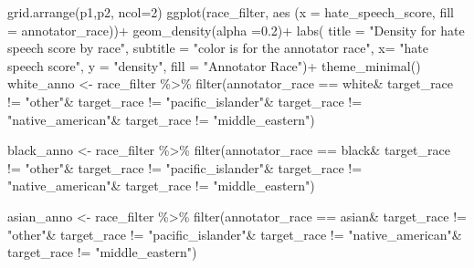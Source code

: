 \documentclass[
]{article}
\newenvironment{Shaded}{\begin{snugshade}}{\end{snugshade}}
\newcommand{\AttributeTok}[1]{\textcolor[rgb]{0.77,0.63,0.00}{#1}}
\newcommand{\DecValTok}[1]{\textcolor[rgb]{0.00,0.00,0.81}{#1}}
\newcommand{\FloatTok}[1]{\textcolor[rgb]{0.00,0.00,0.81}{#1}}
\newcommand{\FunctionTok}[1]{\textcolor[rgb]{0.00,0.00,0.00}{#1}}
\newcommand{\NormalTok}[1]{#1}
\newcommand{\OtherTok}[1]{\textcolor[rgb]{0.56,0.35,0.01}{#1}}
\newcommand{\SpecialCharTok}[1]{\textcolor[rgb]{0.00,0.00,0.00}{#1}}
\newcommand{\StringTok}[1]{\textcolor[rgb]{0.31,0.60,0.02}{#1}}
\begin{document}
\begin{Shaded}
\begin{Highlighting}[]
\FunctionTok{grid.arrange}\NormalTok{(p1,p2, }\AttributeTok{ncol=}\DecValTok{2}\NormalTok{)}
\FunctionTok{ggplot}\NormalTok{(race\_filter, }\FunctionTok{aes}\NormalTok{ (}\AttributeTok{x =}\NormalTok{ hate\_speech\_score, }\AttributeTok{fill =}\NormalTok{ annotator\_race))}\SpecialCharTok{+}
  \FunctionTok{geom\_density}\NormalTok{(}\AttributeTok{alpha =}\FloatTok{0.2}\NormalTok{)}\SpecialCharTok{+}
  \FunctionTok{labs}\NormalTok{(}
    \AttributeTok{title =} \StringTok{"Density for hate speech score by race"}\NormalTok{, }
    \AttributeTok{subtitle =} \StringTok{"color is for the annotator race"}\NormalTok{, }
    \AttributeTok{x=} \StringTok{"hate speech score"}\NormalTok{, }
    \AttributeTok{y =} \StringTok{"density"}\NormalTok{,}
    \AttributeTok{fill =} \StringTok{"Annotator Race"}\NormalTok{)}\SpecialCharTok{+}
  \FunctionTok{theme\_minimal}\NormalTok{()}
\NormalTok{white\_anno }\OtherTok{\textless{}{-}}\NormalTok{ race\_filter }\SpecialCharTok{\%\textgreater{}\%} \FunctionTok{filter}\NormalTok{(annotator\_race }\SpecialCharTok{==} \StringTok{\textquotesingle{}white\textquotesingle{}}\SpecialCharTok{\&}
\NormalTok{                                       target\_race }\SpecialCharTok{!=} \StringTok{"other"}\SpecialCharTok{\&}
\NormalTok{                                       target\_race }\SpecialCharTok{!=} \StringTok{"pacific\_islander"}\SpecialCharTok{\&}
\NormalTok{                                       target\_race }\SpecialCharTok{!=} \StringTok{"native\_american"}\SpecialCharTok{\&}
\NormalTok{                                       target\_race }\SpecialCharTok{!=} \StringTok{"middle\_eastern"}\NormalTok{)}


\NormalTok{black\_anno }\OtherTok{\textless{}{-}}\NormalTok{ race\_filter }\SpecialCharTok{\%\textgreater{}\%} \FunctionTok{filter}\NormalTok{(annotator\_race }\SpecialCharTok{==} \StringTok{\textquotesingle{}black\textquotesingle{}}\SpecialCharTok{\&}
\NormalTok{                                       target\_race }\SpecialCharTok{!=} \StringTok{"other"}\SpecialCharTok{\&}
\NormalTok{                                       target\_race }\SpecialCharTok{!=} \StringTok{"pacific\_islander"}\SpecialCharTok{\&}
\NormalTok{                                       target\_race }\SpecialCharTok{!=} \StringTok{"native\_american"}\SpecialCharTok{\&}
\NormalTok{                                       target\_race }\SpecialCharTok{!=} \StringTok{"middle\_eastern"}\NormalTok{)}

\NormalTok{asian\_anno }\OtherTok{\textless{}{-}}\NormalTok{ race\_filter }\SpecialCharTok{\%\textgreater{}\%} \FunctionTok{filter}\NormalTok{(annotator\_race }\SpecialCharTok{==} \StringTok{\textquotesingle{}asian\textquotesingle{}}\SpecialCharTok{\&}
\NormalTok{                                       target\_race }\SpecialCharTok{!=} \StringTok{"other"}\SpecialCharTok{\&}
\NormalTok{                                       target\_race }\SpecialCharTok{!=} \StringTok{"pacific\_islander"}\SpecialCharTok{\&}
\NormalTok{                                       target\_race }\SpecialCharTok{!=} \StringTok{"native\_american"}\SpecialCharTok{\&}
\NormalTok{                                       target\_race }\SpecialCharTok{!=} \StringTok{"middle\_eastern"}\NormalTok{)}


\end{Highlighting}
\end{Shaded}
\end{document}
